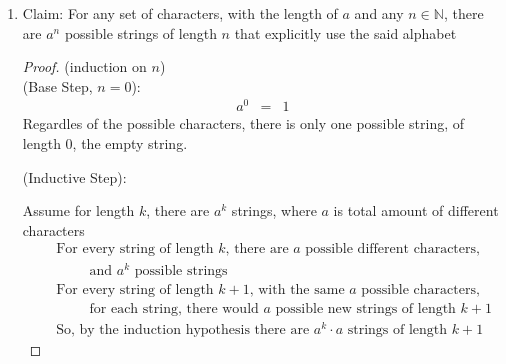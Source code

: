 \documentclass{article}
\begin{document}
\begin{enumerate}
\begin{enumerate}
\begin{proof}
            \hspace{1cm} Assume for length $k$, there are $2^k$ binary strings
            \begin{eqnarray}
                &&\text{For every binary string of length $k$, there are $2^k$ binary strings,} \\
                &&\hspace{1cm} \text{for each binary string, there are two new possible binary strings of length $k+1$,} \\
                &&\text{So, by the induction hypothesis there are $2^k \cdot 2$ binary strings of length $k+1$}
            \end{eqnarray}
        \end{proof}
        \item Claim: For any set of characters, with the length of $a$ and any $n \in \mathbb{N}$, there are $a^n$ possible strings of length $n$ that explicitly use the said alphabet
        \begin{proof}
            (induction on $n$) \\
            (Base Step, $n=0$):
            \begin{eqnarray}
                a^0 &=& 1
            \end{eqnarray}
            \hspace{1cm} Regardles of the possible characters, there is only one possible string, of length $0$, the empty string.

            (Inductive Step):

            \hspace{1cm} Assume for length $k$, there are $a^k$ strings, where $a$ is total amount of different characters
            \begin{eqnarray}
                && \text{For every string of length $k$, there are $a$ possible different characters,} \\
                && \hspace{1cm} \text{and $a^k$ possible strings} \\
                && \text{For every string of length $k+1$, with the same $a$ possible characters,} \\
                && \hspace{1cm} \text{for each string, there would $a$ possible new strings of length $k+1$} \\
                &&\text{So, by the induction hypothesis there are $a^k \cdot a$ strings of length $k+1$}
            \end{eqnarray}
        \end{proof}
    \end{enumerate}
\end{enumerate}
\end{document}
